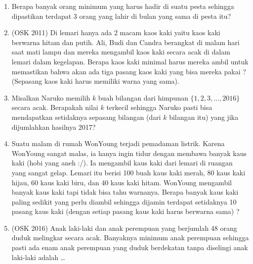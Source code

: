 \documentclass[12pt]{scrartcl}
\begin{document}
\begin{enumerate}
    \item Berapa banyak orang minimum yang harus hadir di suatu pesta sehingga dipastikan terdapat 3 orang yang lahir di bulan yang sama di pesta itu?

    \item (OSK 2011) Di lemari hanya ada 2 macam kaos kaki yaitu kaos kaki berwarna hitam dan putih. Ali, Budi dan Candra berangkat di malam hari saat mati lampu dan mereka mengambil kaos kaki secara acak di dalam lemari dalam kegelapan. Berapa kaos kaki minimal harus mereka ambil untuk memastikan bahwa akan ada tiga pasang kaos kaki yang bisa mereka pakai ? (Sepasang kaos kaki harus memiliki warna yang sama).

    \item Misalkan Naruko memilih $k$ buah bilangan dari himpunan $\{1,2,3,\dots,2016\}$ secara acak. Berapakah nilai $k$ terkecil sehingga Naruko pasti bisa mendapatkan setidaknya sepasang bilangan (dari $k$ bilangan itu) yang jika dijumlahkan hasilnya 2017?
    
    \item Suatu malam di rumah WonYoung terjadi pemadaman listrik. Karena WonYoung sangat malas, ia hanya ingin tidur dengan membawa banyak kaus kaki (hobi yang aneh :/). Ia mengambil kaus kaki dari lemari di ruangan yang sangat gelap. Lemari itu berisi 100 buah kaus kaki merah, 80 kaus kaki hijau, 60 kaus kaki biru, dan 40 kaus kaki hitam. WonYoung mengambil banyak kaus kaki tapi tidak bisa tahu warnanya. Berapa banyak kaus kaki paling sedikit yang perlu diambil sehingga dijamin terdapat setidaknya 10 pasang kaus kaki (dengan setiap pasang kaus kaki harus berwarna sama) ?
    
    \item (OSK 2016) Anak laki-laki dan anak perempuan yang berjumlah 48 orang duduk melingkar secara acak. Banyaknya minimum anak perempuan sehingga pasti ada enam anak perempuan yang duduk berdekatan tanpa diselingi anak laki-laki adalah \dots
\end{enumerate}
\end{document}
